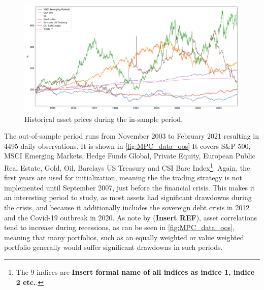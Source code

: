 \begin{figure}[H]
    \centering
    \includegraphics[width=1\textwidth]{analysis/portfolio_exercise/images/asset_vals_insample.png}
    \caption[Historical asset prices during the in-sample period]{Historical asset prices during the in-sample period.}
    \label{fig:MPC_data_is}
\end{figure}

The out-of-sample period runs from November 2003 to February 2021 resulting in 4495 daily observations. It is shown in \cref{fig:MPC_data_oos} It covers S\&P 500, MSCI Emerging Markets, Hedge Funds Global, Private Equity, European Public Real Estate, Gold, Oil, Barclays US Treasury and CSI Barc Index\footnote{
The 9 indices are \textbf{Insert formal name of all indices as indice 1, indice 2 etc.}.
}.
Again, the first years are used for initialization, meaning the the trading strategy is not implemented until September 2007, just before the financial crisis. This makes it an interesting period to study, as most assets had significant drawdowns during the crisis, and because it additionally includes the sovereign debt crisis in 2012 and the Covid-19 outbreak in 2020. As note by (\textbf{Insert REF}), asset correlations tend to increase during recessions, as can be seen in \cref{fig:MPC_data_oos}, meaning that many portfolios, such as an equally weighted or value weighted portfolio generally would suffer significant drawdowns in such periods. 

